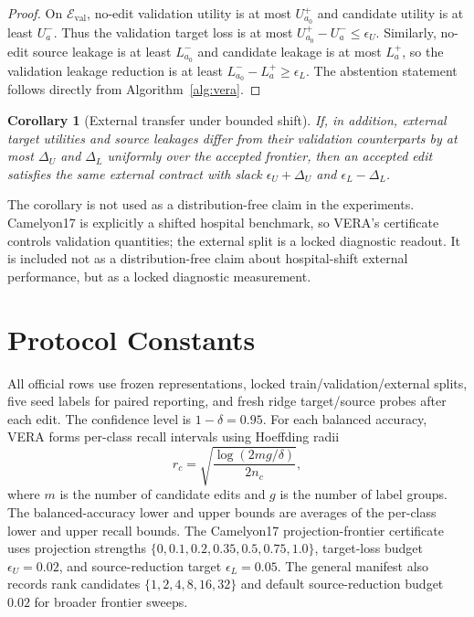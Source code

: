 \documentclass[letterpaper]{article}
\newtheorem{corollary}{Corollary}
\begin{document}
\begin{proof}
On $\mathcal{E}_{\mathrm{val}}$, no-edit validation utility is at most
$U^+_{a_0}$ and candidate utility is at least $U^-_a$. Thus the validation
target loss is at most $U^+_{a_0}-U^-_a\le\epsilon_U$. Similarly, no-edit
source leakage is at least $L^-_{a_0}$ and candidate leakage is at most
$L^+_a$, so the validation leakage reduction is at least
$L^-_{a_0}-L^+_a\ge\epsilon_L$. The abstention statement follows directly from
Algorithm~\ref{alg:vera}.
\end{proof}

\begin{corollary}[External transfer under bounded shift]
If, in addition, external target utilities and source leakages differ from
their validation counterparts by at most $\Delta_U$ and $\Delta_L$ uniformly
over the accepted frontier, then an accepted edit satisfies the same external
contract with slack $\epsilon_U+\Delta_U$ and $\epsilon_L-\Delta_L$.
\end{corollary}

The corollary is not used as a distribution-free claim in the experiments.
Camelyon17 is explicitly a shifted hospital benchmark, so VERA's certificate
controls validation quantities; the external split is a locked diagnostic
readout. It is included not as a distribution-free claim about hospital-shift
external performance, but as a locked diagnostic measurement.

\section{Protocol Constants}

All official rows use frozen representations, locked train/validation/external
splits, five seed labels for paired reporting, and fresh ridge target/source
probes after each edit. The confidence level is $1-\delta=0.95$. For each
balanced accuracy, VERA forms per-class recall intervals using Hoeffding
radii
\[
r_c=\sqrt{\frac{\log(2mg/\delta)}{2n_c}},
\]
where $m$ is the number of candidate edits and $g$ is the number of label
groups. The balanced-accuracy lower and upper bounds are averages of the
per-class lower and upper recall bounds. The Camelyon17 projection-frontier
certificate uses projection strengths
$\{0,0.1,0.2,0.35,0.5,0.75,1.0\}$, target-loss budget
$\epsilon_U=0.02$, and source-reduction target $\epsilon_L=0.05$. The general
manifest also records rank candidates $\{1,2,4,8,16,32\}$ and default
source-reduction budget $0.02$ for broader frontier sweeps.
\end{document}
